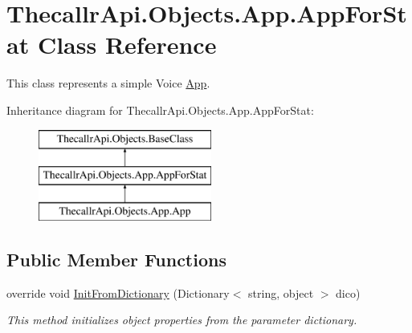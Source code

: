 \hypertarget{class_thecallr_api_1_1_objects_1_1_app_1_1_app_for_stat}{\section{Thecallr\+Api.\+Objects.\+App.\+App\+For\+Stat Class Reference}
\label{class_thecallr_api_1_1_objects_1_1_app_1_1_app_for_stat}
}


This class represents a simple Voice \hyperlink{class_thecallr_api_1_1_objects_1_1_app_1_1_app}{App}.  


Inheritance diagram for Thecallr\+Api.\+Objects.\+App.\+App\+For\+Stat\+:\begin{figure}[H]
\begin{center}
\leavevmode
\includegraphics[height=3.000000cm]{class_thecallr_api_1_1_objects_1_1_app_1_1_app_for_stat}
\end{center}
\end{figure}
\subsection*{Public Member Functions}
\begin{DoxyCompactItemize}
\item 
override void \hyperlink{class_thecallr_api_1_1_objects_1_1_app_1_1_app_for_stat_a9785b6f52acd7a85ae0724873aea9219}{Init\+From\+Dictionary} (Dictionary$<$ string, object $>$ dico)
\begin{DoxyCompactList}\small\item\em This method initializes object properties from the parameter dictionary. \end{DoxyCompactList}\end{DoxyCompactItemize}
